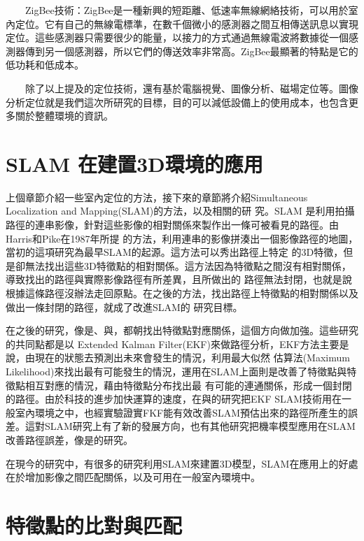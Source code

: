 　　ZigBee技術：ZigBee是一種新興的短距離、低速率無線網絡技術，可以用於室內定位。它有自己的無線電標準，在數千個微小的感測器之間互相傳送訊息以實現定位。這些感測器只需要很少的能量，以接力的方式通過無線電波將數據從一個感測器傳到另一個感測器，所以它們的傳送效率非常高。ZigBee最顯著的特點是它的低功耗和低成本。

　　除了以上提及的定位技術，還有基於電腦視覺、圖像分析、磁場定位等。圖像分析定位就是我們這次所研究的目標，目的可以減低設備上的使用成本，也包含更多關於整體環境的資訊。


\section{SLAM 在建置3D環境的應用}

	上個章節介紹一些室內定位的方法，接下來的章節將介紹Simultaneous Localization and Mapping(SLAM)的方法，以及相關的研
究。SLAM 是利用拍攝路徑的連串影像，針對這些影像的相對關係來製作出一條可被看見的路徑。由Harris和Pike在1987年所提
\cite{Harris198887}的方法，利用連串的影像拼湊出一個影像路徑的地圖，當初的這項研究為最早SLAM的起源。這方法可以秀出路徑上特定
的3D特徵，但是卻無法找出這些3D特徵點的相對關係。這方法因為特徵點之間沒有相對關係，導致找出的路徑與實際影像路徑有所差異，且所做出的
路徑無法封閉，也就是說根據這條路徑沒辦法走回原點。在之後的方法，找出路徑上特徵點的相對關係以及做出一條封閉的路徑，就成了改進SLAM的
研究目標。

	在之後的研究，像是\cite{174711}、\cite{1087373}與\cite{Smith1988}，都朝找出特徵點對應關係，這個方向做加強。這些研究的共同點都是以 Extended Kalman Filter(EKF)來做路徑分析，EKF方法主要是說，由現在的狀態去預測出未來會發生的情況，利用最大似然
估算法(Maximum Likelihood)來找出最有可能發生的情況，運用在SLAM上面則是改善了特徵點與特徵點相互對應的情況，藉由特徵點分布找出最
有可能的連通關係，形成一個封閉的路徑。由於科技的進步加快運算的速度，在\cite{Betge1996}與\cite{Davison2001}的研究把EKF 
SLAM技術用在一般室內環境之中，也經實驗證實FKF能有效改善SLAM預估出來的路徑所產生的誤差。這對SLAM研究上有了新的發展方向，也有其他研究把機率模型應用在SLAM改善路徑誤差，像是\cite{Durrant2003}的研究。

	在現今的研究中，有很多的研究利用SLAM來建置3D模型，SLAM在應用上的好處在於增加影像之間匹配關係，以及可用在一般室內環境中。


\section{特徵點的比對與匹配}

